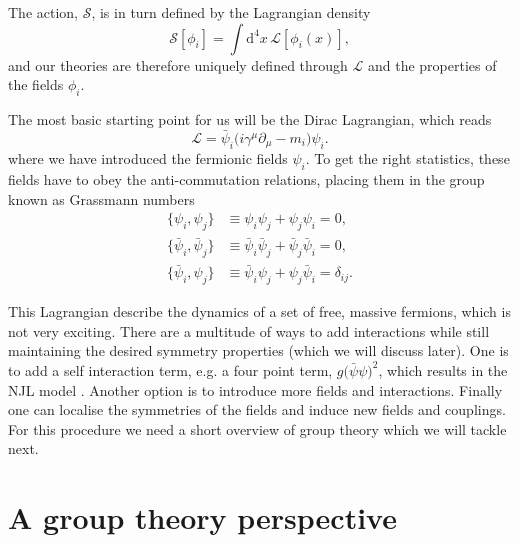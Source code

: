 The action, $\mathcal{S}$, is in turn defined by the Lagrangian density
%
\begin{equation}
  \mathcal{S}[\phi_i] = \int \mathrm{d}^4 x\, \mathcal{L}[\phi_i(x)],
\end{equation}
%
and our theories are therefore uniquely defined through $\mathcal{L}$ and the
properties of the fields $\phi_i$.

The most basic starting point for us will be the Dirac Lagrangian, which reads
%
\begin{equation}
  \mathcal{L} = \bar{\psi}_i \big(i\gamma^{\mu} \partial_{\mu} - m_i\big)
  \psi_i. \label{eq:ldirac}
\end{equation}
%
where we have introduced the fermionic fields $\psi_i$. To get the right
statistics, these fields have to obey the anti-commutation relations, placing
them in the group known as Grassmann numbers
%
\begin{align}
  \big\{ \psi_i, \psi_j \big\} &\equiv \psi_i \psi_j + \psi_j \psi_i = 0,\\
  \big\{ \bar{\psi}_i, \bar{\psi}_j \big\} &\equiv \bar{\psi}_i \bar{\psi}_j +
    \bar{\psi}_j \bar{\psi}_i = 0,\\
  \big\{ \bar{\psi}_i, \psi_j \big\} &\equiv \bar{\psi}_i \psi_j + \psi_j
    \bar{\psi}_i = \delta_{ij}.
\end{align}

This Lagrangian describe the dynamics of a set of free, massive fermions, which
is not very exciting. There are a multitude of ways to add interactions while
still maintaining the desired symmetry properties (which we will discuss later).
One is to add a self interaction term, e.g. a four point term, $g
\big(\bar{\psi}\psi\big)^2$, which results in the NJL model
\citep{Nambu:1961tp}. Another option is to introduce more fields and
interactions. Finally one can localise the symmetries of the fields and induce
new fields and couplings. For this procedure we need a short overview of group
theory which we will tackle next.

\section{A group theory perspective} \label{sec:group_intro}

